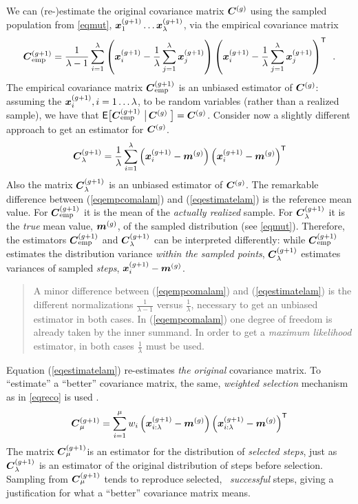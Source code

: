 \documentclass{article} %
\newenvironment{einschub}{%
\begin{small} \begin{quotation}\noindent}{%
  \vspace{0.5ex}\end{quotation}\end{small}%
}
\newcommand{\kom}[1]{}
\newcommand{\ve}[1]{\mathchoice{\mbox{\boldmath$\displaystyle#1$}}
  {\mbox{\boldmath$\textstyle#1$}} {\mbox{\boldmath$\scriptstyle#1$}}
  {\mbox{\boldmath$\scriptscriptstyle#1$}}}
\newcommand{\ma}[1]{\mathchoice{\mbox{\boldmath$\displaystyle#1$}}
  {\mbox{\boldmath$\textstyle#1$}} {\mbox{\boldmath$\scriptstyle#1$}}
  {\mbox{\boldmath$\scriptscriptstyle#1$}}}
\newcommand{\T}{\ensuremath{\mathsf{T}}}
\newcommand{\rklam}[1]{\left({#1}\right)}
\newcommand{\summ}[2]{\sum_{#1=1}^{#2}}
\newcommand{\lam}{\ensuremath{\lambda}}
\newcommand{\Cg}{\ensuremath{\ma{C}^{(g)}}}
\newcommand{\Cgg}{\ma{C}^{(g+1)}}
\newcommand{\xgg}{\ve{x}^{(g+1)}}
\newcommand{\xmean}{\ensuremath{\ve{m}}}
\newcommand{\xmeang}{\ensuremath{\xmean^{(g)}}}
\newcommand{\eqrefadd}[1]{(\ref{#1})} %
\newcommand{\eqsref}[1]{(\ref{#1})}
\newcommand{\Eqref}[1]{Equation (\ref{#1})}
\newcommand{\Extext}[1]{{\mathsf{E}}\hspace{-0.0em}\big[#1\big]}
\begin{document}
 We can (re-)estimate the original covariance matrix $\Cg$ using the
 sampled population from \eqref{eqmut}, $\xgg_1\dots\xgg_\lam$, via
 the empirical covariance matrix
%
\begin{equation}\label{eqempcomalam}
    \Cgg_\mathrm{emp} = \frac{1}{\lam-1}\sum_{i=1}^{\lam}
    \rklam{\xgg_i - \frac{1}{\lam}\sum_{j=1}^{\lam}\xgg_j}
    \rklam{\xgg_i - \frac{1}{\lam}\sum_{j=1}^{\lam}\xgg_j}^\T
    \enspace.
\end{equation}
%
The empirical covariance matrix $\Cgg_\mathrm{emp}$ is an
unbiased estimator of $\Cg$:\kom{ \\$\Cgg_\lam = \arg \max_{\ma{C}}
  P(\xgg_1,\dots,\xgg_\lam |\xmeang, \ma{C})$} assuming the $\xgg_{i},
i=1\dots\lam$, to be random variables (rather than a realized sample),
we have that $\Extext{\Cgg_\mathrm{emp}\,\left|\,\Cg\right.} = \Cg$.
Consider now a slightly different approach to get an estimator for
$\Cg$.
%
\begin{equation}\label{eqestimatelam}
  \Cgg_\lam = \frac{1}{\lam}\sum_{i=1}^\lam 
              \rklam{\xgg_i - \xmeang}\rklam{\xgg_i - \xmeang}^\T
\end{equation}
%
Also the matrix $\Cgg_\lam$ is an unbiased estimator of $\Cg$. The
remarkable difference between \eqsref{eqempcomalam} and
\eqrefadd{eqestimatelam} is the reference mean value.  For
$\Cgg_\mathrm{emp}$ it is the mean of the \emph{actually realized}
sample.  For $\Cgg_\lam$ it is the \emph{true} mean value, $\xmeang$,
of the sampled distribution (see \eqref{eqmut}).  Therefore, the
estimators $\Cgg_\mathrm{emp}$ and $\Cgg_\lam$ can be interpreted
differently: while $\Cgg_\mathrm{emp}$ estimates the distribution
variance \emph{within the sampled points}, $\Cgg_\lam$ estimates
variances of sampled \emph{steps}, $\xgg_i - \xmeang$. 
%
\begin{einschub}%
 A minor difference between \eqsref{eqempcomalam} and
 \eqrefadd{eqestimatelam} is the different normalizations
 $\frac{1}{\lam-1}$ versus $\frac{1}{\lam}$, necessary to get an
 unbiased estimator in both cases. In \eqsref{eqempcomalam} one degree
 of freedom is already taken by the inner summand. In order to get a
 \emph{maximum likelihood} estimator\kom{ for the $\xgg_i-\xmeang$}, 
 in both cases $\frac{1}{\lam}$ must be
 used.
\end{einschub}
%

\Eqref{eqestimatelam} re-estimates \emph{the original} covariance
matrix.  To ``estimate'' a ``better'' covariance matrix,
the same, \emph{weighted
  selection} mechanism as in \eqref{eqreco} is used
\cite{Hansen:2004b}.
%
\begin{equation}\label{eqCmu}
  \Cgg_\mu = \summ{i}{\mu} w_i \rklam{\xgg_{i:\lam} - \xmeang}
      \rklam{\xgg_{i:\lam} - \xmeang}^\T
\end{equation}
The matrix $\Cgg_\mu$is an estimator for the distribution of
\emph{selected steps}, just as $\Cgg_\lam$ is an estimator of the
original distribution of steps before selection. Sampling from
$\Cgg_\mu$ tends to reproduce selected, \ie\ \emph{successful} steps,
giving a justification for what a ``better'' covariance
matrix means. 
\end{document}
